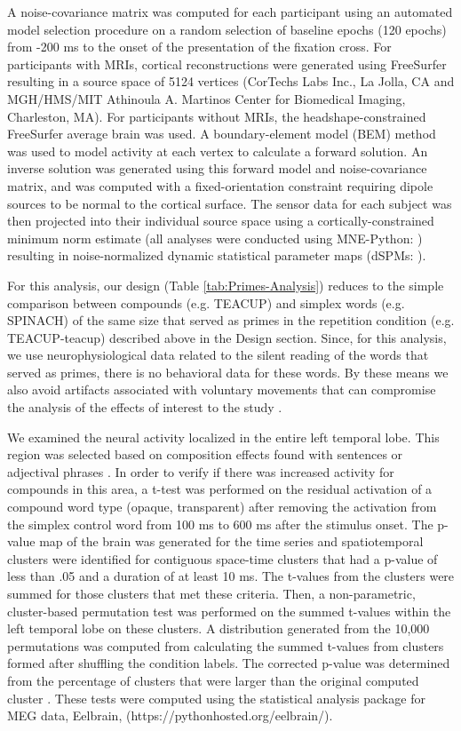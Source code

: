 \documentclass{frontiersSCNS}
\begin{document}
A noise-covariance matrix was computed for each participant using an automated model selection procedure \citep*{Engemann:2014} on a random selection of baseline epochs (120 epochs) from -200 ms to the onset of the presentation of the fixation cross.  For participants with MRIs, cortical reconstructions were generated using FreeSurfer resulting in a source space of 5124 vertices (CorTechs Labs Inc., La Jolla, CA and MGH/HMS/MIT Athinoula A. Martinos Center for Biomedical Imaging, Charleston, MA). For participants without MRIs, the headshape-constrained FreeSurfer average brain was used. A boundary-element model (BEM) method was used to model activity at each vertex to calculate a forward solution. An inverse solution was generated using this forward model and noise-covariance matrix, and was computed with a fixed-orientation constraint requiring dipole sources to be normal to the cortical surface.
The sensor data for each subject was then projected into their individual source space using a cortically-constrained minimum norm estimate (all analyses were conducted using MNE-Python: \citet*{Gramfort:2013, Gramfort:2013a}) resulting in noise-normalized dynamic statistical parameter maps (dSPMs: \citet*{Dale:2000}).

For this analysis, our design (Table \ref{tab:Primes-Analysis}) reduces to the simple comparison between compounds (e.g. TEACUP) and simplex words (e.g. SPINACH) of the same size that served as primes in the repetition condition (e.g. TEACUP-teacup) described above in the Design section. Since, for this analysis, we use neurophysiological data related to the silent reading of the words that served as primes, there is no behavioral data for these words.  By these means we also avoid artifacts associated with voluntary movements that can compromise the analysis of the effects of interest to the study \citep*{Hansen:2010}.
 
We examined the neural activity localized in the entire left temporal lobe. This region was selected based on composition effects found with sentences \citep{Friederici:2000} or adjectival phrases \citep{Bemis:2011}.
In order to verify if there was increased activity for compounds in this area, a t-test was performed on the residual activation of a compound word type (opaque, transparent) after removing the activation from the simplex control word from 100 ms to 600 ms after the stimulus onset. The p-value map of the brain was generated for the time series and spatiotemporal clusters were identified for contiguous space-time clusters that had a p-value of less than .05 and a duration of at least 10 ms. The t-values from the clusters were summed for those clusters that met these criteria. Then, a non-parametric, cluster-based permutation test was performed on the summed t-values within the left temporal lobe on these clusters. A distribution generated from the 10,000 permutations was computed from calculating the summed t-values from clusters formed after shuffling the condition labels. The corrected p-value was determined from the percentage of clusters that were larger than the original computed cluster \citep*{Maris:2007}. These tests were computed using the statistical analysis package for MEG data, Eelbrain, (https://pythonhosted.org/eelbrain/).
\end{document}
